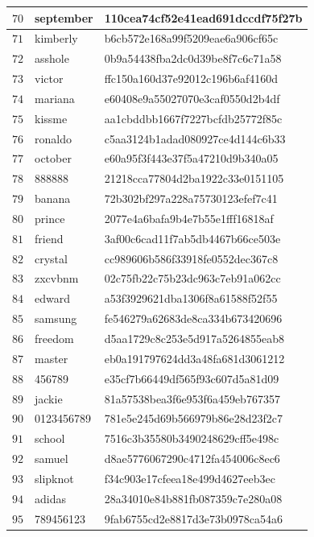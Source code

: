\begin{longtable}{|l|l|l|}
    $70$ & september & 110cea74cf52e41ead691dccdf75f27b \\ \hline
    $71$ & kimberly & b6cb572e168a99f5209eae6a906cf65c \\ \hline
    $72$ & asshole & 0b9a54438fba2dc0d39be8f7c6c71a58 \\ \hline
    $73$ & victor & ffc150a160d37e92012c196b6af4160d \\ \hline
    $74$ & mariana & e60408e9a55027070e3caf0550d2b4df \\ \hline
    $75$ & kissme & aa1cbddbb1667f7227bcfdb25772f85c \\ \hline
    $76$ & ronaldo & c5aa3124b1adad080927ce4d144c6b33 \\ \hline
    $77$ & october & e60a95f3f443e37f5a47210d9b340a05 \\ \hline
    $78$ & 888888 & 21218cca77804d2ba1922c33e0151105 \\ \hline
    $79$ & banana & 72b302bf297a228a75730123efef7c41 \\ \hline
    $80$ & prince & 2077e4a6bafa9b4e7b55e1fff16818af \\ \hline
    $81$ & friend & 3af00c6cad11f7ab5db4467b66ce503e \\ \hline
    $82$ & crystal & cc989606b586f33918fe0552dec367c8 \\ \hline
    $83$ & zxcvbnm & 02c75fb22c75b23dc963c7eb91a062cc \\ \hline
    $84$ & edward & a53f3929621dba1306f8a61588f52f55 \\ \hline
    $85$ & samsung & fe546279a62683de8ca334b673420696 \\ \hline
    $86$ & freedom & d5aa1729c8c253e5d917a5264855eab8 \\ \hline
    $87$ & master & eb0a191797624dd3a48fa681d3061212 \\ \hline
    $88$ & 456789 & e35cf7b66449df565f93c607d5a81d09 \\ \hline
    $89$ & jackie & 81a57538bea3f6e953f6a459eb767357 \\ \hline
    $90$ & 0123456789 & 781e5e245d69b566979b86e28d23f2c7 \\ \hline
    $91$ & school & 7516c3b35580b3490248629cff5e498c \\ \hline
    $92$ & samuel & d8ae5776067290c4712fa454006c8ec6 \\ \hline
    $93$ & slipknot & f34c903e17cfeea18e499d4627eeb3ec \\ \hline
    $94$ & adidas & 28a34010e84b881fb087359c7e280a08 \\ \hline
    $95$ & 789456123 & 9fab6755cd2e8817d3e73b0978ca54a6 \\ \hline

\end{longtable}
